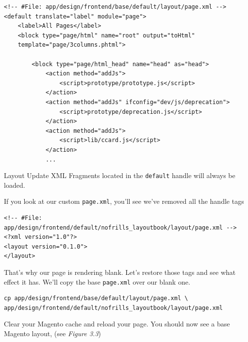 \documentclass[oneside]{book}
\begin{document}
\begin{lstlisting}
<!-- #File: app/design/frontend/base/default/layout/page.xml -->
<default translate="label" module="page">
    <label>All Pages</label>
    <block type="page/html" name="root" output="toHtml"
    template="page/3columns.phtml">

        <block type="page/html_head" name="head" as="head">
            <action method="addJs">
                <script>prototype/prototype.js</script>
            </action>
            <action method="addJs" ifconfig="dev/js/deprecation">
                <script>prototype/deprecation.js</script>
            </action>
            <action method="addJs">
                <script>lib/ccard.js</script>
            </action>
            ...

\end{lstlisting}


Layout Update XML Fragments located in the \footnotesize\texttt{default} \normalsize  handle will always be loaded.

If you look at our custom \footnotesize\texttt{page.xml}\normalsize, you'll see we've removed all the handle tags

\begin{lstlisting}
<!-- #File: app/design/frontend/default/nofrills_layoutbook/layout/page.xml -->
<?xml version="1.0"?>
<layout version="0.1.0">
</layout>

\end{lstlisting}


That's why our page is rendering blank. Let's restore those tags and see what effect it has.  We'll copy the base \footnotesize\texttt{page.xml} \normalsize  over our blank one.

\begin{lstlisting}
cp app/design/frontend/base/default/layout/page.xml \
app/design/frontend/default/nofrills_layoutbook/layout/page.xml

\end{lstlisting}


Clear your Magento cache and reload your page.  You should now see a base Magento layout, (see \emph{Figure 3.3})
\end{document}

